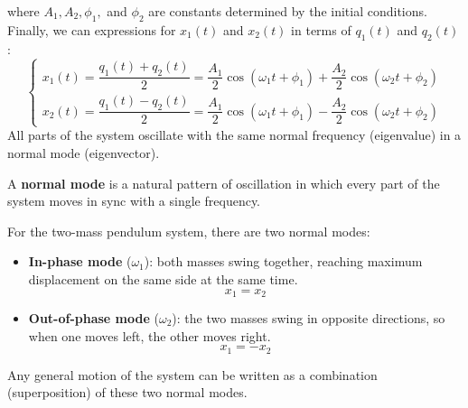 \documentclass[11pt]{report}
\begin{document}
\begin{definition}
\begin{equation}
    \end{equation}
    where \( A_1, A_2, \phi_1, \) and \( \phi_2 \) are constants determined by the initial conditions. Finally, we can expressions for \( x_1(t) \) and \( x_2(t) \) in terms of \( q_1(t) \) and \( q_2(t) \):
    \begin{equation}\label{eq:x_from_q}
        \begin{cases}
            x_1(t) = \dfrac{q_1(t) + q_2(t)}{2} = \dfrac{A_1}{2} \cos(\omega_1 t + \phi_1) + \dfrac{A_2}{2} \cos(\omega_2 t + \phi_2) \\
            x_2(t) = \dfrac{q_1(t) - q_2(t)}{2} = \dfrac{A_1}{2} \cos(\omega_1 t + \phi_1) - \dfrac{A_2}{2} \cos(\omega_2 t + \phi_2)
        \end{cases}
    \end{equation}
    All parts of the system oscillate with the same normal frequency (eigenvalue) in a normal mode (eigenvector).
\end{definition}

\begin{definition}
    A \textbf{normal mode} is a natural pattern of oscillation in which every part of the system moves in sync with a single frequency. 

    For the two-mass pendulum system, there are two normal modes:
    \begin{itemize}
        \item \textbf{In-phase mode} (\(\omega_1\)): both masses swing together, reaching maximum displacement on the same side at the same time.  
    \begin{equation}\label{eq:in_phase}
    x_1 = x_2
    \end{equation}
        
        \item \textbf{Out-of-phase mode} (\(\omega_2\)): the two masses swing in opposite directions, so when one moves left, the other moves right.  
    \begin{equation}\label{eq:out_phase}
    x_1 = -x_2
    \end{equation}
    \end{itemize}

    Any general motion of the system can be written as a combination (superposition) of these two normal modes.
\end{definition}
\end{document}
